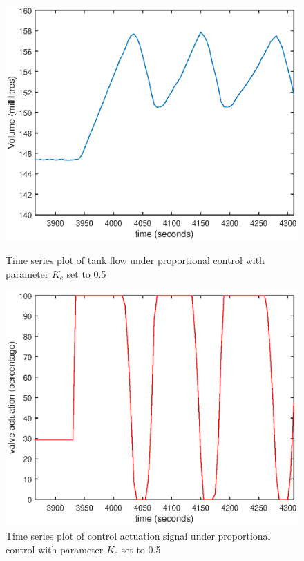\documentclass{article}
\begin{document}
\begin{figure}[h]
	\centering
	\begin{minipage}{0.45\textwidth}
		\centering
		\includegraphics[scale=0.4]{P_Kc_05.eps}
		\caption{Time series plot of tank flow under proportional control with parameter $K_c$ set to 0.5}
	\end{minipage}
	\hspace{0.5cm}
	\begin{minipage}{0.45\textwidth}
		\centering
		\includegraphics[scale=0.4]{P_Kc_05_control.eps}
		\caption{Time series plot of control actuation signal under proportional control with parameter $K_c$ set to 0.5}
	\end{minipage}
\end{figure}
\end{document}
